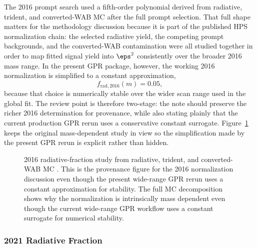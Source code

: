 The 2016 prompt search used a fifth-order polynomial derived from radiative, trident,
and converted-WAB MC after the full prompt selection. That full shape matters for the
methodology discussion because it is part of the published HPS normalization chain:
the selected radiative yield, the competing prompt backgrounds, and the converted-WAB
contamination were all studied together in order to map fitted signal yield into
$\eps^2$ consistently over the broader 2016 mass range. In the present GPR package,
however, the working 2016 normalization is simplified to a constant approximation,
\begin{equation}
f_{\mathrm{rad},2016}(m) = 0.05,
\end{equation}
because that choice is numerically stable over the wider scan range used in the global
fit. The review point is therefore two-stage: the note should preserve the richer 2016
determination for provenance, while also stating plainly that the current production
GPR rerun uses a conservative constant surrogate. Figure~\ref{fig:2016-radfrac} keeps
the original mass-dependent study in view so the simplification made by the present GPR
rerun is explicit rather than hidden.

\begin{figure}[H]
\centering
{}
\caption{2016 radiative-fraction study from radiative, trident, and converted-WAB MC
\cite{HPS2016BumpInternal}. This is the provenance figure for the 2016 normalization
discussion even though the present wide-range GPR rerun uses a constant approximation
for stability. The full MC decomposition shows why the normalization is intrinsically
mass dependent even though the current wide-range GPR workflow uses a constant
surrogate for numerical stability.}
\label{fig:2016-radfrac}
\end{figure}

\subsubsection{2021 Radiative Fraction}

